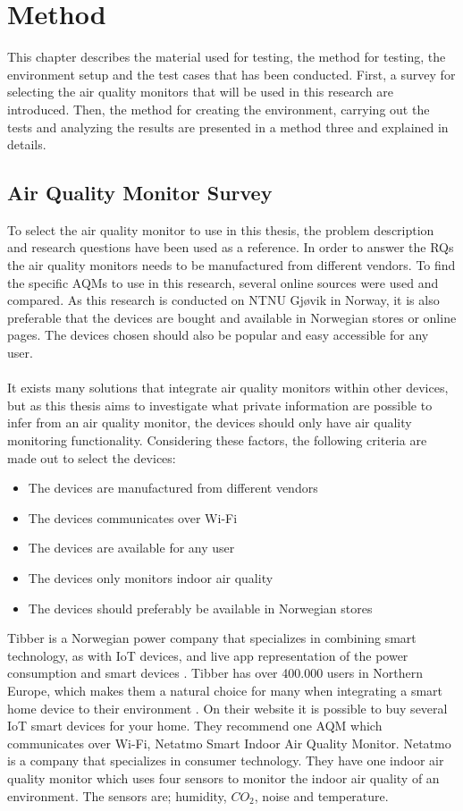 \chapter{Method}
This chapter describes the material used for testing, the method for testing, the environment setup and the test cases that has been conducted. First, a survey for selecting the air quality monitors that will be used in this research are introduced. Then, the method for creating the environment, carrying out the tests and analyzing the results are presented in a method three and explained in details.  

\section{Air Quality Monitor Survey}
To select the air quality monitor to use in this thesis, the problem description and research questions have been used as a reference. In order to answer the RQs the air quality monitors needs to be manufactured from different vendors. To find the specific AQMs to use in this research, several online sources were used and compared. As this research is conducted on NTNU Gjøvik in Norway, it is also preferable that the devices are bought and available in Norwegian stores or online pages. The devices chosen should also be popular and easy accessible for any user. 
\\\\
It exists many solutions that integrate air quality monitors within other devices, but as this thesis aims to investigate what private information are possible to infer from an air quality monitor, the devices should only have air quality monitoring functionality.  Considering these factors, the following criteria are made out to select the devices:
\begin{itemize}
    \item The devices are manufactured from different vendors
    \item The devices communicates over Wi-Fi
    \item The devices are available for any user
    \item The devices only monitors indoor air quality
    \item The devices should preferably be available in Norwegian stores
\end{itemize}
Tibber \cite{Tibber} is a Norwegian power company that specializes in combining smart technology, as with IoT devices, and live app representation of the power consumption and smart devices \cite{Tibber}.  Tibber has over 400.000 users in Northern Europe, which makes them a natural choice for many when integrating a smart home device to their environment \cite{TibberUsers}. On their website it is possible to buy several IoT smart devices for your home. They recommend one AQM which communicates over Wi-Fi, Netatmo Smart Indoor Air Quality Monitor. Netatmo \cite{Netatmo} is a company that specializes in consumer technology. They have one indoor air quality monitor which uses four sensors to monitor the indoor air quality of an environment. The sensors are; humidity, \(CO_2\), noise and temperature. 
